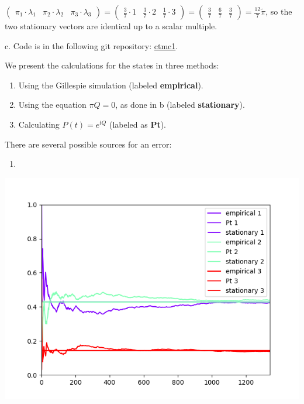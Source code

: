 \documentclass{article}
\begin{document}
$\begin{pmatrix}
    \pi_1\cdot\lambda_1 & \pi_2\cdot\lambda_2 & \pi_3\cdot\lambda_3
\end{pmatrix}=\begin{pmatrix}
    \frac{3}{7}\cdot{1} & \frac{3}{7}\cdot{2} & \frac{1}{7}\cdot{3}
\end{pmatrix}=\begin{pmatrix}
    \frac{3}{7} & \frac{6}{7} & \frac{3}{7}
\end{pmatrix}=\frac{12}{7}\tilde\pi$, so the two stationary vectors are identical up to a scalar multiple.

c. Code is in the following git repository: \href{https://github.com/HaimL76/ctmc1.git}{ctmc1}.

We present the calculations for the states in three methods:
\begin{enumerate}
    \item Using the Gillespie simulation (labeled \textbf{empirical}).
    \item Using the equation $\pi{Q}=0$, as done in b (labeled \textbf{stationary}).
    \item Calculating $P(t)=e^{tQ}$ (labeled as \textbf{Pt}).
\end{enumerate}

There are several possible sources for an error:
\begin{enumerate}
    \item 
\end{enumerate}
\includegraphics{ctmc1.png}
\end{document}
